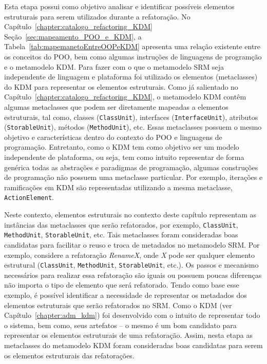Esta etapa possui como objetivo analisar e identificar possíveis elementos estruturais para serem utilizados durante a refatoração. No Capítulo~\ref{chapter:catalogo_refactoring_KDM} Seção~\ref{sec:mapeamento_POO_e_KDM}, a Tabela~\ref{tab:mapemanetoEntreOOPeKDM} apresenta uma relação existente entre os conceitos do POO, bem como algumas instruções de linguagens de programção e o metamodelo KDM. Para fazer com o que o metamodelo SRM seja independente de linguagem e plataforma foi utilizado os elementos (metaclasses) do KDM para representar os elementos estruturais. Como já salientado no Capítulo~\ref{chapter:catalogo_refactoring_KDM}, o metamodelo KDM contêm algumas metaclasses que podem ser diretamente mapeadas a elementos estruturais, tal como, classes (\texttt{ClassUnit}), interfaces (\texttt{InterfaceUnit}), atributos (\texttt{StorableUnit}), métodos (\texttt{MethodUnit}), etc. Essas metaclasses possuem o mesmo objetivo e características dentro do contexto do POO e linguagens de programação. Entretanto, como o KDM tem como objetivo ser um modelo independente de plataforma, ou seja, tem como intuito representar de forma genérica todas as abstrações e paradigmas de programação, algumas construções de programação não possuem uma metaclasse particular. Por exemplo, iterações e ramificações em KDM são representadas utilizando a mesma metaclasse, \texttt{ActionElement}.

Neste contexto, elementos estruturais no contexto deste capítulo representam as instâncias das metaclasses que serão refatorados, por exemplo, \texttt{ClassUnit}, \texttt{MethodUnit}, \texttt{StorableUnit}, etc. Tais metaclasses foram consideradas boas candidatas para facilitar o reuso e troca de metadados no metamodelo SRM. Por exemplo, considere a refatoração \textit{RenameX}, onde \textit{X} pode ser qualquer elemento estrutural (\texttt{ClassUnit}, \texttt{MethodUnit}, \texttt{StorableUnit}, etc.). Os passos e mecanismo necessários para realizar essa refatoração são iguais ou possuem poucas diferenças não importa o tipo de elemento que será refatorado. Tendo como base esse exemplo, é possível identificar a necessidade de representar os metadados dos elementos estruturais que serão refatorados no SRM. Como o KDM (ver Capítulo~\ref{chapter:adm_kdm}) foi desenvolvido com o intuito de representar todo o sistema, bem como, seus artefatos – o mesmo é um bom candidato para representar os elementos estruturais de uma refatoração. Assim, nesta etapa as metaclasses do metamodelo KDM foram consideradas boas candidatas para serem os elementos estruturais das refatorações.

